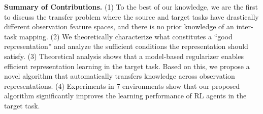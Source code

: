 \textbf{Summary of Contributions.} 
(1) To the best of our knowledge, we are the first to discuss the transfer problem where the source and target tasks have drastically different observation feature spaces, and there is no prior knowledge of an inter-task mapping.
(2) We theoretically characterize what constitutes a ``good representation'' and analyze the sufficient conditions the representation should satisfy.
(3) Theoretical analysis shows that a model-based regularizer enables efficient representation learning in the target task. Based on this, we propose a novel algorithm that automatically transfers knowledge across observation representations.
(4) Experiments in 7 environments show that our proposed algorithm significantly improves the learning performance of RL agents in the target task.

